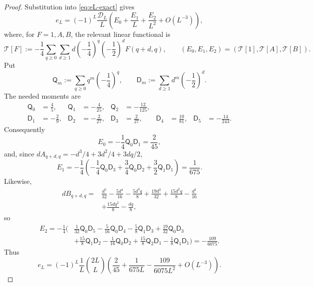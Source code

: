 \documentclass[11pt]{article}
\theoremstyle{definition}
\theoremstyle{remark}
\begin{document}
\begin{proof}
Substitution into \eqref{eq:eL-exact} gives
\begin{equation}
 e_L=(-1)^L\frac{\mathscr D_L}{L}
 \left(E_0+\frac{E_1}{L}+\frac{E_2}{L^2}+O(L^{-3})\right),
 \label{eq:eL-three-coefficients-pre}
\end{equation}
where, for \(F=1,A,B\), the relevant linear functional is
\begin{equation}
 \mathcal T[F]
 :=-\frac14\sum_{q\ge0}\sum_{d\ge1}
 d\left(-\frac14\right)^q
 \left(-\frac12\right)^dF(q+d,q),
 \qquad
 (E_0,E_1,E_2)=(\mathcal T[1],\mathcal T[A],\mathcal T[B]).
 \label{eq:eL-corner-functional}
\end{equation}
Put
\[
 \mathsf Q_m:=\sum_{q\ge0}q^m\left(-\frac14\right)^q,
 \qquad
 \mathsf D_m:=\sum_{d\ge1}d^m\left(-\frac12\right)^d.
\]
The needed moments are
\begin{align*}
 \mathsf Q_0&=\frac45,&
 \mathsf Q_1&=-\frac4{25},&
 \mathsf Q_2&=-\frac{12}{125},\\
 \mathsf D_1&=-\frac29,&
 \mathsf D_2&=-\frac2{27},&
 \mathsf D_3&=\frac2{27},&
 \mathsf D_4&=\frac{10}{81},&
 \mathsf D_5&=-\frac{14}{243}.
\end{align*}
Consequently
\[
 E_0=-\frac14\mathsf Q_0\mathsf D_1=\frac2{45},
\]
and, since
\(dA_{q+d,q}=-d^3/4+3d^2/4+3dq/2\),
\begin{equation}
 E_1=-\frac14\left(
 -\frac14\mathsf Q_0\mathsf D_3
 +\frac34\mathsf Q_0\mathsf D_2
 +\frac32\mathsf Q_1\mathsf D_1\right)
 =\frac1{675}.
 \label{eq:eL-E1-evaluation}
\end{equation}
Likewise,
\begin{align*}
 dB_{q+d,q}={}&
 \frac{d^5}{32}-\frac{5d^4}{16}
 -\frac{5d^3q}{8}+\frac{19d^3}{32}
 +\frac{15d^2q}{8}-\frac{d^2}{16}\\
 &+\frac{15dq^2}{8}-\frac{dq}{8},
\end{align*}
so
\begin{align}
 E_2=-\frac14\bigg(&
 \frac1{32}\mathsf Q_0\mathsf D_5
 -\frac5{16}\mathsf Q_0\mathsf D_4
 -\frac58\mathsf Q_1\mathsf D_3
 +\frac{19}{32}\mathsf Q_0\mathsf D_3\nonumber\\
 &+\frac{15}{8}\mathsf Q_1\mathsf D_2
 -\frac1{16}\mathsf Q_0\mathsf D_2
 +\frac{15}{8}\mathsf Q_2\mathsf D_1
 -\frac18\mathsf Q_1\mathsf D_1\bigg)
 =-\frac{109}{6075}.
 \label{eq:eL-E2-evaluation}
\end{align}
Thus
\begin{equation}
 {
 e_L=(-1)^L\frac1L\binom{2L}{L}
 \left(
 \frac2{45}+\frac{1}{675L}
 -\frac{109}{6075L^2}+O(L^{-3})\right).}
 \label{eq:eL-second}
\end{equation}


\end{proof}
\end{document}

